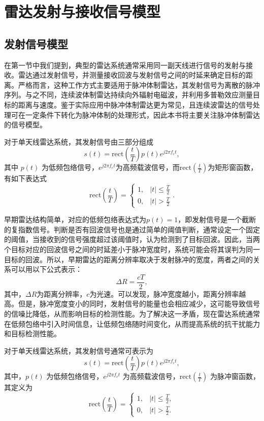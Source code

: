 \chapter{雷达发射与接收信号模型}

\section{发射信号模型}\label{sec_radar_signal_model}
在第一节中我们提到，典型的雷达系统通常采用同一副天线进行信号的发射与接收。雷达通过发射信号，并测量接收回波与发射信号之间的时延来确定目标的距离。严格而言，这种工作方式主要适用于脉冲体制雷达，其发射信号为离散的脉冲序列。与之不同，连续波体制雷达持续向外辐射电磁波，并利用多普勒效应测量目标的距离与速度。鉴于实际应用中脉冲体制雷达更为常见，且连续波雷达的信号处理可在一定条件下转化为脉冲体制的处理形式，因此本书将主要关注脉冲体制雷达的信号模型。

对于单天线雷达系统，其发射信号由三部分组成
\[
    s(t) = \text{rect}\left(\frac{t}{T}\right) p(t) e^{j 2 \pi f_c t},
\]
其中 \( p(t) \) 为低频包络信号，\( e^{j 2 \pi f_c t} \)为高频载波信号，而\( \text{rect}\left(\frac{t}{T}\right) \)为矩形窗函数，有如下表达式
\[
    \text{rect}\left(\frac{t}{T}\right) =
    \begin{cases}
        1, & |t| \leq \frac{T}{2} \\
        0, & |t| > \frac{T}{2}
    \end{cases}.
\]

早期雷达结构简单，对应的低频包络表达式为\( p(t) = 1 \)，即发射信号是一个截断的复指数信号。判断是否有回波信号也是通过简单的阈值判断，通常设定一个固定的阈值，当接收到的信号强度超过该阈值时，认为检测到了目标回波。因此，当两个目标对应的回波信号之间的时延差小于脉冲宽度时，系统可能会将其误判为同一目标的回波。所以，早期雷达的距离分辨率取决于发射脉冲的宽度，两者之间的关系可以用以下公式表示：
\[
    \Delta R = \frac{cT}{2},
\]
其中，\( \Delta R \)为距离分辨率，\( c \)为光速。可以发现，脉冲宽度越小，距离分辨率越高。但是，脉冲宽度变小的同时，发射信号的能量也会相应减少，这可能导致信号的信噪比降低，从而影响目标的检测性能。为了解决这一矛盾，现在雷达系统通常在低频包络中引入时间信息，让低频包络随时间变化，从而提高系统的抗干扰能力和目标检测性能。

对于单天线雷达系统，其发射信号通常可表示为
\begin{equation}
    s(t) = \text{rect}\left(\frac{t}{T}\right) p(t) e^{j 2 \pi f_c t},
\end{equation}
其中，$p(t)$ 为低频包络信号，$e^{j 2 \pi f_c t}$ 为高频载波信号，$\text{rect}\left(\frac{t}{T}\right)$ 为脉冲窗函数，其定义为
\begin{equation}
    \text{rect}\left(\frac{t}{T}\right) =
    \begin{cases}
        1, & |t| \leq \frac{T}{2}, \\
        0, & |t| > \frac{T}{2}.
    \end{cases}
\end{equation}

